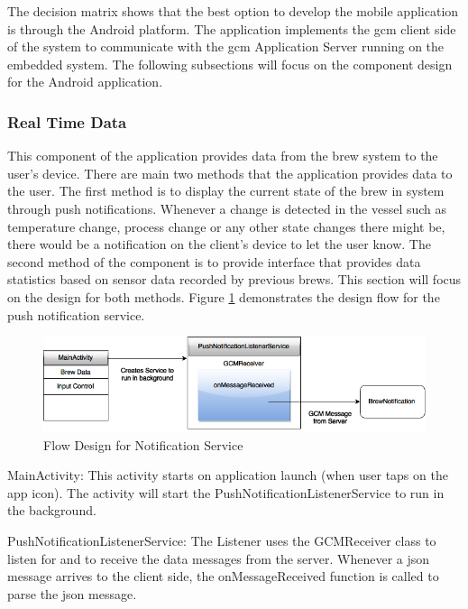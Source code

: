 \documentclass{article}
\begin{document}
\noindent The decision matrix shows that the best option to develop the mobile application is through the Android platform. The application implements the \gls{gcm} client side of the system to communicate with the \gls{gcm} Application Server running on the embedded system. The following subsections will focus on the component design for the Android application.


\subsubsection{Real Time Data}
This component of the application provides data from the brew system to the user's device. There are main two methods that the application provides data to the user. The first method is to display the current state of the brew in system through push notifications. Whenever a change is detected in the vessel such as temperature change, process change or any other state changes there might be, there would be a notification on the client's device to let the user know. The second method of the component is to provide interface that provides data statistics based on sensor data recorded by previous brews. This section will focus on the design for both methods. Figure \ref{fig:gcm-push-notification} demonstrates the design flow for the push notification service.

\begin{figure}[H]
\begin{center}
\includegraphics[scale=0.60]{gcm-push-notification.png}
\caption{Flow Design for Notification Service}
\label{fig:gcm-push-notification}
\end{center}
\end{figure}

\noindent MainActivity: This activity starts on application launch (when user taps on the app icon). The activity will start the PushNotificationListenerService to run in the background.

\noindent PushNotificationListenerService: The Listener uses the GCMReceiver class to listen for and to receive the data messages from the server. Whenever a \gls{json} message arrives to the client side, the onMessageReceived function is called to parse the \gls{json} message.
\end{document}
